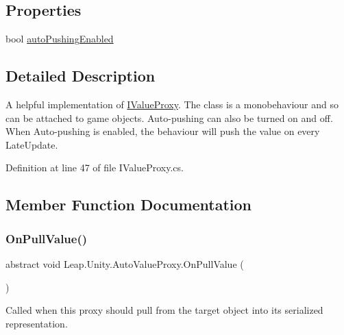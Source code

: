 \subsection*{Properties}
\begin{DoxyCompactItemize}
\item 
bool \mbox{\hyperlink{class_leap_1_1_unity_1_1_auto_value_proxy_aedd186d51ac2dec53cf80435546d7096}{auto\+Pushing\+Enabled}}
\end{DoxyCompactItemize}


\subsection{Detailed Description}
A helpful implementation of \mbox{\hyperlink{interface_leap_1_1_unity_1_1_i_value_proxy}{I\+Value\+Proxy}}. The class is a monobehaviour and so can be attached to game objects. Auto-\/pushing can also be turned on and off. When Auto-\/pushing is enabled, the behaviour will push the value on every Late\+Update. 



Definition at line 47 of file I\+Value\+Proxy.\+cs.



\subsection{Member Function Documentation}
\mbox{\label{class_leap_1_1_unity_1_1_auto_value_proxy_a2d62ff32cd2a3ca3caaeb5debd19cecf}} 
\subsubsection{\texorpdfstring{OnPullValue()}{OnPullValue()}}
{\footnotesize\ttfamily abstract void Leap.\+Unity.\+Auto\+Value\+Proxy.\+On\+Pull\+Value (\begin{DoxyParamCaption}{ }\end{DoxyParamCaption})\hspace{0.3cm}{\ttfamily [pure virtual]}}



Called when this proxy should pull from the target object into its serialized representation. 



